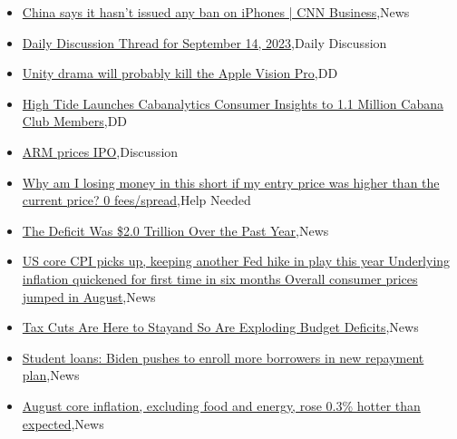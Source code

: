 \documentclass{article}%
\begin{document}
%
\begin{itemize}%
\item%
\href{https://reddit.com/r/wallstreetbets/comments/16ifgll/china\_says\_it\_hasnt\_issued\_any\_ban\_on\_iphones\_cnn/}{China says it hasn't issued any ban on iPhones | CNN Business},News%
\item%
\href{https://reddit.com/r/wallstreetbets/comments/16iecrf/daily\_discussion\_thread\_for\_september\_14\_2023/}{Daily Discussion Thread for September 14, 2023},Daily Discussion%
\item%
\href{https://reddit.com/r/wallstreetbets/comments/16idgkd/unity\_drama\_will\_probably\_kill\_the\_apple\_vision/}{Unity drama will probably kill the Apple Vision Pro},DD%
\item%
\href{https://reddit.com/r/Baystreetbets/comments/16igld3/high\_tide\_launches\_cabanalytics\_consumer\_insights/}{High Tide Launches Cabanalytics Consumer Insights to 1.1 Million Cabana Club Members},DD%
\item%
\href{https://reddit.com/r/StockMarket/comments/16i1dha/arm\_prices\_ipo/}{ARM prices IPO},Discussion%
\item%
\href{https://reddit.com/r/StockMarket/comments/16hxfla/why\_am\_i\_losing\_money\_in\_this\_short\_if\_my\_entry/}{Why am I losing money in this short if my entry price was higher than the current price? 0 fees/spread},Help Needed%
\item%
\href{https://reddit.com/r/Economics/comments/16hpy0w/the\_deficit\_was\_20\_trillion\_over\_the\_past\_year/}{The Deficit Was \$2.0 Trillion Over the Past Year},News%
\item%
\href{https://reddit.com/r/Economics/comments/16hp5ga/us\_core\_cpi\_picks\_up\_keeping\_another\_fed\_hike\_in/}{US core CPI picks up, keeping another Fed hike in play this year  Underlying inflation quickened for first time in six months  Overall consumer prices jumped in August},News%
\item%
\href{https://reddit.com/r/Economics/comments/16hozkg/tax\_cuts\_are\_here\_to\_stayand\_so\_are\_exploding/}{Tax Cuts Are Here to Stayand So Are Exploding Budget Deficits},News%
\item%
\href{https://reddit.com/r/Economics/comments/16hoogl/student\_loans\_biden\_pushes\_to\_enroll\_more/}{Student loans: Biden pushes to enroll more borrowers in new repayment plan},News%
\item%
\href{https://reddit.com/r/Economics/comments/16hlwtq/august\_core\_inflation\_excluding\_food\_and\_energy/}{August core inflation, excluding food and energy, rose 0.3\% hotter than expected},News%
\end{itemize}%
\end{document}
